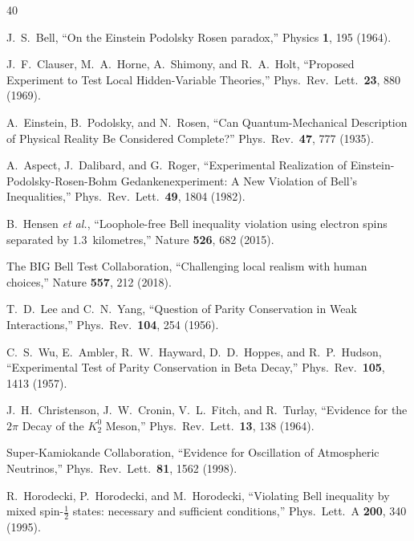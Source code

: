 \documentclass[prl,twocolumn,superscriptaddress,floatfix]{revtex4-2}
\begin{document}
\begin{thebibliography}{40}

  J.~S.~Bell,
  ``On the Einstein Podolsky Rosen paradox,''
  Physics \textbf{1}, 195 (1964).

  J.~F.~Clauser, M.~A.~Horne, A.~Shimony, and R.~A.~Holt,
  ``Proposed Experiment to Test Local Hidden-Variable Theories,''
  Phys.\ Rev.\ Lett.\ \textbf{23}, 880 (1969).

  A.~Einstein, B.~Podolsky, and N.~Rosen,
  ``Can Quantum-Mechanical Description of Physical Reality Be
  Considered Complete?''
  Phys.\ Rev.\ \textbf{47}, 777 (1935).

  A.~Aspect, J.~Dalibard, and G.~Roger,
  ``Experimental Realization of Einstein-Podolsky-Rosen-Bohm
  Gedankenexperiment: A New Violation of Bell's Inequalities,''
  Phys.\ Rev.\ Lett.\ \textbf{49}, 1804 (1982).

  B.~Hensen \textit{et al.},
  ``Loophole-free Bell inequality violation using electron spins
  separated by 1.3~kilometres,''
  Nature \textbf{526}, 682 (2015).

  The BIG Bell Test Collaboration,
  ``Challenging local realism with human choices,''
  Nature \textbf{557}, 212 (2018).

  T.~D.~Lee and C.~N.~Yang,
  ``Question of Parity Conservation in Weak Interactions,''
  Phys.\ Rev.\ \textbf{104}, 254 (1956).

  C.~S.~Wu, E.~Ambler, R.~W.~Hayward, D.~D.~Hoppes, and R.~P.~Hudson,
  ``Experimental Test of Parity Conservation in Beta Decay,''
  Phys.\ Rev.\ \textbf{105}, 1413 (1957).

  J.~H.~Christenson, J.~W.~Cronin, V.~L.~Fitch, and R.~Turlay,
  ``Evidence for the $2\pi$ Decay of the $K_2^0$ Meson,''
  Phys.\ Rev.\ Lett.\ \textbf{13}, 138 (1964).

  Super-Kamiokande Collaboration,
  ``Evidence for Oscillation of Atmospheric Neutrinos,''
  Phys.\ Rev.\ Lett.\ \textbf{81}, 1562 (1998).

  R.~Horodecki, P.~Horodecki, and M.~Horodecki,
  ``Violating Bell inequality by mixed spin-$\tfrac{1}{2}$ states:
  necessary and sufficient conditions,''
  Phys.\ Lett.\ A \textbf{200}, 340 (1995).


\end{thebibliography}
\end{document}
